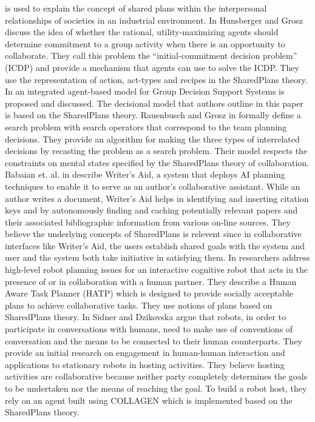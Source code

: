\documentclass[12pt]{report}
\begin{document}
\cite{grosz:plans-discourse} is used to explain the concept of shared plans
within the interpersonal relationships of societies in an industrial
environment. In \cite{hunsberger:auction-collaborative} Hunsberger and Grosz
discuss the idea of whether the rational, utility-maximizing agents should
determine commitment to a group activity when there is an opportunity to
collaborate. They call this problem the ``initial-commitment decision problem''
(ICDP) and provide a mechanism that agents can use to solve the ICDP. They use
the representation of action, act-types and recipes in the SharedPlans theory.
In \cite{zamfirescu:gdss} an integrated agent-based model for Group Decision
Support Systems is proposed and discussed. The decisional model that authors
outline in this paper is based on the SharedPlans theory. Rauenbusch and Grosz
in \cite{rauenbusch:decision-making-planning} formally define a search problem
with search operators that correspond to the team planning decisions.
They provide an algorithm for making the three types of interrelated decisions
by recasting the problem as a search problem. Their model respects the
constraints on mental states specified by the SharedPlans theory of
collaboration. Babaian et. al. in \cite{babaian:writers-assistant} describe
Writer's Aid, a system that deploys AI planning techniques to enable it to serve
as an author's collaborative assistant. While an author writes a document,
Writer's Aid helps in identifying and inserting citation keys and by
autonomously finding and caching potentially relevant papers and their
associated bibliographic information from various on-line sources. They believe
the underlying concepts of SharedPlans is relevent since in collaborative
interfaces like Writer’s Aid, the users establish shared goals with the system
and user and the system both take initiative in satisfying them. In
\cite{montreuil:planning-robot-activity} researchers address high-level robot
planning issues for an interactive cognitive robot that acts in the presence of
or in collaboration with a human partner. They describe a Human Aware Task
Planner (HATP) which is designed to provide socially acceptable plans to achieve
collaborative tasks. They use notions of plans based on SharedPlans theory. In
\cite{sidner:enagagement-robot} Sidner and Dzikovska argue that robots, in order
to participate in conversations with humans, need to make use of conventions of
conversation and the means to be connected to their human counterparts. They
provide an initial research on engagement in human-human interaction and
applications to stationary robots in hosting activities. They believe hosting
activities are collaborative because neither party completely determines the
goals to be undertaken nor the means of reaching the goal. To build a robot
host, they rely on an agent built using COLLAGEN which is implemented based on
the SharedPlans theory.\\
\end{document}
